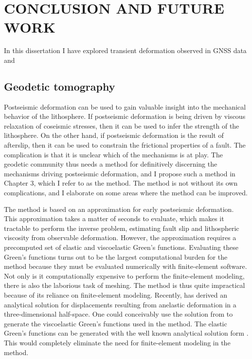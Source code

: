 \chapter{CONCLUSION AND FUTURE WORK}


In this dissertation I have explored transient deformation observed in GNSS data and   

\section{Geodetic tomography}
Postseismic deformation can be used to gain valuable insight into the mechanical behavior of the lithosphere. If postseismic deformation is being driven by viscous relaxation of coseismic stresses, then it can be used to infer the strength of the lithosphere. On the other hand, if postseismic deformation is the result of afterslip, then it can be used to constrain the frictional properties of a fault. The complication is that it is unclear which of the mechanisms is at play. The geodetic community thus needs a method for definitively discerning the mechanisms driving postseismic deformation, and I propose such a method in Chapter 3, which I refer to as the \citet{Hines2016} method. The \citet{Hines2016} method is not without its own complications, and I elaborate on some areas where the method can be improved.  

The \citet{Hines2016} method is based on an approximation for early postseismic deformation. This approximation takes a matter of seconds to evaluate, which makes it tractable to perform the inverse problem, estimating fault slip and lithospheric viscosity from observable deformation. However, the approximation requires a precomputed set of elastic and viscoelastic Green's functions. Evaluating these Green's functions turns out to be the largest computational burden for the \citet{Hines2016} method because they must be evaluated numerically with finite-element software. Not only is it computationally expensive to perform the finite-element modeling, there is also the laborious task of meshing. The \citet{Hines2016} method is thus quite impractical because of its reliance on finite-element modeling. Recently, \citet{Barbot2017} has derived an analytical solution for displacements resulting from anelastic deformation in a three-dimensional half-space. One could conceivably use the solution from \citet{Barbot2017} to generate the viscoelastic Green's functions used in the \citet{Hines2016} method. The elastic Green's functions can be generated with the well known analytical solution form \citet{Okada1992}. This would completely eliminate the need for finite-element modeling in the \citet{Hines2016} method.       
 
